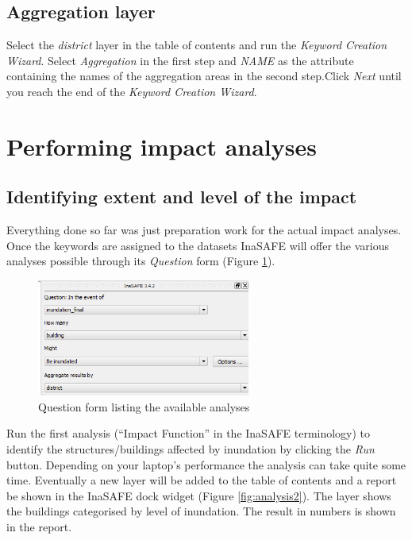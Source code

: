 \documentclass[a4paper,12pt,titlepage]{article}
\begin{document}
\subsection{Aggregation layer}

Select the \textit{district} layer in the table of contents and run the \textit{Keyword Creation Wizard}. Select \textit{Aggregation} in the first step and \textit{NAME} as the attribute containing the names of the aggregation areas in the second step.Click \textit{Next} until you reach the end of the \textit{Keyword Creation Wizard}.

\section{Performing impact analyses}

\subsection{Identifying extent and level of the impact}

Everything done so far was just preparation work for the actual impact analyses. Once the keywords are assigned to the datasets InaSAFE will offer the various analyses possible through its \textit{Question} form (Figure \ref{fig:analysis1}). 

\begin{figure}[htb]
	\centering
	\includegraphics[width=7cm]{Images/analysis1.png}
	\caption{Question form listing the available analyses}\label{fig:analysis1}
\end{figure}

Run the first analysis (``Impact Function'' in the InaSAFE terminology) to identify the structures/buildings affected by inundation by clicking the \textit{Run} button. Depending on your laptop's performance the analysis can take quite some time. Eventually a new layer will be added to the table of contents and a report be shown in the InaSAFE dock widget (Figure \ref{fig:analysis2}). The layer shows the buildings categorised by level of inundation. The result in numbers is shown in the report.
\end{document}
